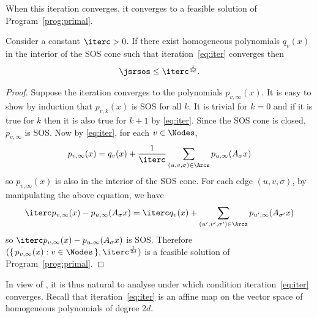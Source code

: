 When this iteration converges, it converges to a feasible solution of Program~\ref{prog:primal}.
\begin{lemma}
  \label{lem:conv}
  Consider a constant $\iterc > 0$.
  If there exist homogeneous polynomials $q_v(x)$ in the interior of the SOS cone such that
  iteration~\eqref{eq:iter} converges then
  \[
    \jsrsos \leq \iterc^{\frac{1}{2d}}.
  \]
  \begin{proof}
    Suppose the iteration converges to the polynomials $p_{v,\infty}(x)$.
    It is easy to show by induction that $p_{v,k}(x)$ is SOS for all $k$.
    It is trivial for $k = 0$ and if it is true for $k$ then it is also true for $k+1$ by \eqref{eq:iter}.
    Since the SOS cone is closed, $p_{v,\infty}$ is SOS.
    Now by \eqref{eq:iter}, for each $v \in \Nodes$,
    \[ p_{v,\infty}(x) = q_v(x) + \frac{1}{\iterc} %
    \sum_{(u,v,\sigma) \in \Arcs} p_{u,\infty}(A_\sigma x) \]
    so $p_{v,\infty}(x)$ is also in the interior of the SOS cone.
    For each edge $(u,v,\sigma)$, by manipulating the above equation, we have
    \[ \iterc p_{v,\infty}(x) - p_{u,\infty}(A_\sigma x) = \iterc q_v(x) + %
    \sum_{(u',v',\sigma') \in \Arcs} p_{u',\infty}(A_{\sigma'} x) \]
    so $\iterc p_{v,\infty}(x) - p_{u,\infty}(A_\sigma x)$ is SOS.
    Therefore $(\{\, p_{v,\infty}(x) : v \in \Nodes \,\}, \iterc^{\frac{1}{2d}})$ is a feasible solution of Program~\ref{prog:primal}.
  \end{proof}
\end{lemma}

In view of , it is thus natural to analyse
under which condition iteration~\ref{eq:iter} converges. Recall
that iteration~\ref{eq:iter} is an affine map on the vector space of
homogeneous polynomials of degree $2d$.

